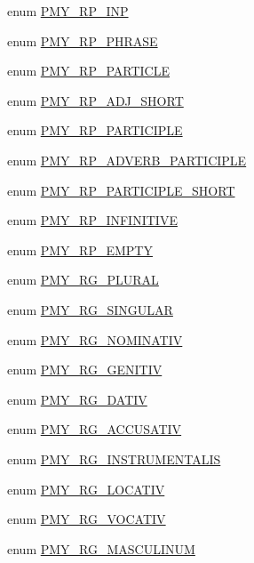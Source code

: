 \begin{DoxyCompactItemize}
enum \hyperlink{gramtab__consts_8php_a40a6e0ca157472f1085f6eccbfdcc72e}{PMY\_\-RP\_\-INP} 
\item 
enum \hyperlink{gramtab__consts_8php_a7f18c7a5ef85835d864d23bc6fd5e980}{PMY\_\-RP\_\-PHRASE} 
\item 
enum \hyperlink{gramtab__consts_8php_a924b3e8ce5e5c6fd89b57d0aa2805803}{PMY\_\-RP\_\-PARTICLE} 
\item 
enum \hyperlink{gramtab__consts_8php_a91be79f36adc821ebaab5885457054eb}{PMY\_\-RP\_\-ADJ\_\-SHORT} 
\item 
enum \hyperlink{gramtab__consts_8php_afec9a820d40c4b88f51f6139728fc183}{PMY\_\-RP\_\-PARTICIPLE} 
\item 
enum \hyperlink{gramtab__consts_8php_a324cb98cd6cc8d250f94087da8c4707d}{PMY\_\-RP\_\-ADVERB\_\-PARTICIPLE} 
\item 
enum \hyperlink{gramtab__consts_8php_a21bd2e0e0e899c4d207e76bab5b33452}{PMY\_\-RP\_\-PARTICIPLE\_\-SHORT} 
\item 
enum \hyperlink{gramtab__consts_8php_a2a285cc66b82729078347489aa43cdb8}{PMY\_\-RP\_\-INFINITIVE} 
\item 
enum \hyperlink{gramtab__consts_8php_a7f04425d66341eaf9a0e24e302f4565d}{PMY\_\-RP\_\-EMPTY} 
\item 
enum \hyperlink{gramtab__consts_8php_aaa38992b2f8e65b15b62d199a4995bb7}{PMY\_\-RG\_\-PLURAL} 
\item 
enum \hyperlink{gramtab__consts_8php_a65d029e2e690803426e385648d9e6ee2}{PMY\_\-RG\_\-SINGULAR} 
\item 
enum \hyperlink{gramtab__consts_8php_a3e2e224a4ea21be24bb3f8050f7ab887}{PMY\_\-RG\_\-NOMINATIV} 
\item 
enum \hyperlink{gramtab__consts_8php_a2c3156ba2524611cf1b8ea2876de471c}{PMY\_\-RG\_\-GENITIV} 
\item 
enum \hyperlink{gramtab__consts_8php_a47a75c26f7ed16169ab1c89817fb7b57}{PMY\_\-RG\_\-DATIV} 
\item 
enum \hyperlink{gramtab__consts_8php_a9e1855d5ef2022cf9534c0817f012aa0}{PMY\_\-RG\_\-ACCUSATIV} 
\item 
enum \hyperlink{gramtab__consts_8php_a54ff2c17cac211ab8833c36b1f1a9b3e}{PMY\_\-RG\_\-INSTRUMENTALIS} 
\item 
enum \hyperlink{gramtab__consts_8php_a7ebbc1d45376818c685e7d242713dbfe}{PMY\_\-RG\_\-LOCATIV} 
\item 
enum \hyperlink{gramtab__consts_8php_a5030efd3e5c7463e0ae7aea2103f93dd}{PMY\_\-RG\_\-VOCATIV} 
\item 
enum \hyperlink{gramtab__consts_8php_a711aca23ed2bdcdec47be3866cb16f07}{PMY\_\-RG\_\-MASCULINUM} 

\end{DoxyCompactItemize}
